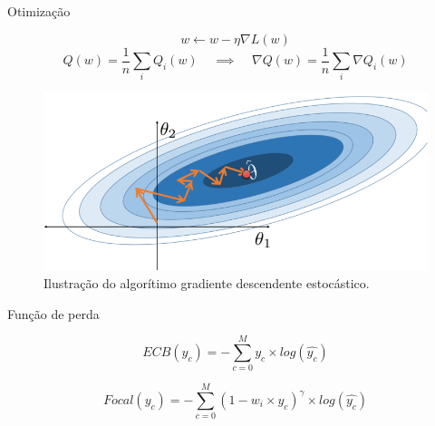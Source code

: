 \documentclass[8pt]{beamer}
\begin{document}
\begin{frame}{Otimização}

\begin{equation}
    w \leftarrow w - \eta \nabla L(w)
\end{equation}
\begin{equation}
Q(w) = \frac{1}{n}\sum_i Q_i(w)\;\;\;\;\implies\;\;\;\; \nabla Q(w) = \frac{1}{n}\sum_i \nabla Q_i(w)
\end{equation}
\begin{figure}[!ht]
    \centering
        \includegraphics[width=0.6\columnwidth]{Imagens/stochastic_gradient_descent.PNG}
    \caption{Ilustração do algorítimo gradiente descendente estocástico. }
    \label{fig:SGD}
\end{figure}
\end{frame}

\begin{frame}{Função de perda}

    \begin{equation}
        ECB(y_c) = -\sum_{c=0}^{M} y_c \times log(\hat{y_c})
    \end{equation}

    \begin{equation}
        Focal(y_c) = -\sum_{c=0}^{M} (1-w_i \times y_c)^\gamma \times log(\hat{y_c})
    \end{equation}

\end{frame}
\end{document}
